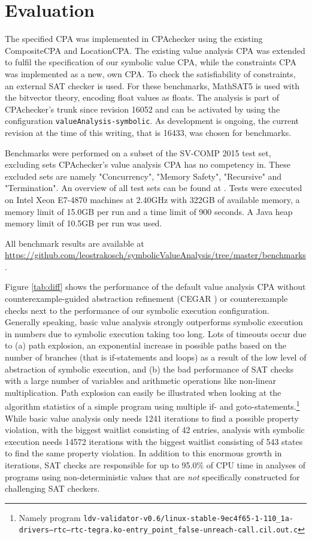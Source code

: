 \section{Evaluation}
The specified CPA was implemented in CPAchecker\cite{Beyer2011} using the existing CompositeCPA and LocationCPA.
The existing value analysis CPA  was extended to fulfil the specification of our symbolic value CPA,
while the constraints CPA was implemented as a new, own CPA. To check the satisfiability of constraints, an external SAT checker is used. For these benchmarks, MathSAT5 is used with the bitvector theory, encoding float values as floats.
The analysis is part of CPAchecker's trunk since revision 16052 and can be activated by using the configuration \texttt{valueAnalysis-symbolic}. As development is ongoing, the current revision at the time of this writing, that is 16433, was chosen for benchmarks.

Benchmarks were performed on a subset of the SV-COMP 2015 test set, excluding sets CPAchecker's value analysis CPA has no competency in.
These excluded sets are namely "Concurrency", "Memory Safety", "Recursive" and "Termination". An overview of all test sets can be found at \cite{SV15Tasks}.
Tests were executed on Intel Xeon E7-4870 machines at 2.40GHz with 322GB of available memory, a memory limit of 15.0GB per run and a time limit of 900 seconds.
A Java heap memory limit of 10.5GB per run was used.

All benchmark results are available at \url{https://github.com/leostrakosch/symbolicValueAnalysis/tree/master/benchmarks}.

Figure \ref{tab:diff} shows the performance of the default value analysis CPA without counterexample-guided abstraction refinement (CEGAR \cite{Beyer2013}) or counterexample checks next to the performance of our symbolic execution configuration.
Generally speaking, basic value analysis strongly outperforms symbolic execution in numbers due to symbolic execution taking too long.
Lots of timeouts occur due to
(a) path explosion, an exponential increase in possible paths based on the number of branches (that is if-statements and loops) as a result of the low level of abstraction of symbolic execution, and
(b) the bad performance of SAT checks with a large number of variables and arithmetic operations like non-linear multiplication.
Path explosion can easily be illustrated when looking at the algorithm statistics of a simple program using multiple if- and goto-statements.\footnote{Namely program \texttt{ldv-validator-v0.6/linux-stable-9ec4f65-1-110\_1a-drivers--rtc--rtc-tegra.ko-entry\_point\_false-unreach-call.cil.out.c}}
While basic value analysis only needs 1241 iterations to find a possible property violation, with the biggest waitlist consisting of 42 entries,
analysis with symbolic execution needs 14572 iterations with the biggest waitlist consisting of 543 states to find the same property violation.
In addition to this enormous growth in iterations, SAT checks are responsible for up to 95.0\% of CPU time in analyses of programs using non-deterministic values that are \emph{not} specifically constructed for challenging SAT checkers.

